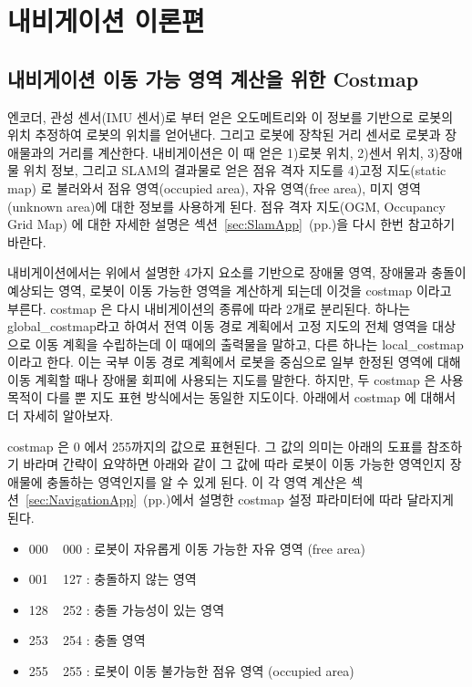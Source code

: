 \newpage
\section{내비게이션 이론편}
\label{sec:NavigationTheory}

\subsection{내비게이션 이동 가능 영역 계산을 위한 Costmap}

엔코더, 관성 센서(IMU 센서)로 부터 얻은 오도메트리와 이 정보를 기반으로 로봇의 위치 추정하여 로봇의 위치를 얻어낸다. 그리고 로봇에 장착된 거리 센서로 로봇과 장애물과의 거리를 계산한다. 내비게이션은 이 때 얻은 1)로봇 위치, 2)센서 위치, 3)장애물 위치 정보, 그리고 SLAM의 결과물로 얻은 점유 격자 지도를 4)고정 지도(static map) 로 불러와서 점유 영역(occupied area), 자유 영역(free area), 미지 영역(unknown area)에 대한 정보를 사용하게 된다. 점유 격자 지도(OGM, Occupancy Grid Map) 에 대한 자세한 설명은 섹션~\ref{sec:SlamApp}~(pp.\pageref{sec:SlamApp})을 다시 한번 참고하기 바란다.

내비게이션에서는 위에서 설명한 4가지 요소를 기반으로 장애물 영역, 장애물과 충돌이 예상되는 영역, 로봇이 이동 가능한 영역을 계산하게 되는데 이것을 costmap 이라고 부른다. costmap 은 다시 내비게이션의 종류에 따라 2개로 분리된다. 하나는 global\_costmap라고 하여서 전역 이동 경로 계획에서 고정 지도의 전체 영역을 대상으로 이동 계획을 수립하는데 이 때에의 출력물을 말하고, 다른 하나는 local\_costmap 이라고 한다. 이는 국부 이동 경로 계획에서 로봇을 중심으로 일부 한정된 영역에 대해 이동 계획할 때나 장애물 회피에 사용되는 지도를 말한다. 하지만, 두 costmap 은 사용 목적이 다를 뿐 지도 표현 방식에서는 동일한 지도이다. 아래에서 costmap 에 대해서 더 자세히 알아보자.

costmap 은 0 에서 255까지의 값으로 표현된다. 그 값의 의미는 아래의 도표를 참조하기 바라며 간략이 요약하면 아래와 같이 그 값에 따라 로봇이 이동 가능한 영역인지 장애물에 충돌하는 영역인지를 알 수 있게 된다. 이 각 영역 계산은 섹션~\ref{sec:NavigationApp}~(pp.\pageref{sec:NavigationApp})에서 설명한 costmap 설정 파라미터에 따라 달라지게 된다.

\vspace{\baselineskip}
\begin{itemize}[leftmargin=*]
\item 000 ~ 000 : 로봇이 자유롭게 이동 가능한 자유 영역 (free area)
\item 001 ~ 127 : 충돌하지 않는 영역
\item 128 ~ 252 : 충돌 가능성이 있는 영역
\item 253 ~ 254 : 충돌 영역
\item 255 ~ 255 : 로봇이 이동 불가능한 점유 영역 (occupied area)
\end{itemize}

